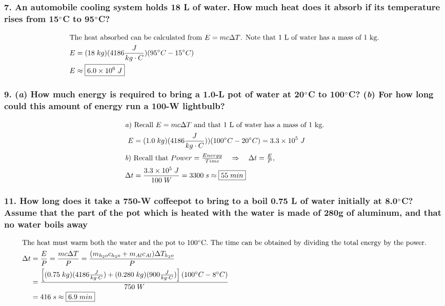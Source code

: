\documentclass{article}
\newcommand\rr{\quad\Rightarrow\quad}
\begin{document}
\subsubsection*{
    7. An automobile cooling system holds 18 L of water. How much heat does
    it absorb if its temperature rises from 15$\degree$C to 95$\degree$C?
}
\begin{align*}
    \intertext{The heat absorbed can be calculated from $E=mc\Delta T$. Note that 1 L of water has a mass of 1 kg.}
    E &= (18\;kg)(4186\frac{J}{kg\cdot C})(95\degree C - 15\degree C) \\  
    E &\approx \boxed{6.0 \times 10^6\;J} \\
\end{align*}
\subsubsection*{
    9. (\textit a) How much energy is required to bring a 1.0-L pot of water at 20$\degree$C to
    100$\degree$C? (\textit b) For how long could this amount of energy run a 100-W lightbulb?
}
\begin{align*}
    \intertext{\textit a) Recall $E = mc\Delta T$ and that 1 L of water has a mass of 1 kg.}
    E &= (1.0\;kg)(4186\frac{J}{kg\cdot C}))(100\degree C - 20\degree C) = 3.3 \times 10^5\;J \\
    \intertext{\textit b) Recall that $Power = \frac{Energy}{Time} \rr \Delta t = \frac{E}{P},$}
    \Delta t &= \frac{3.3 \times 10^5\;J}{100\;W} = 3300\;s \approx \boxed{55\;min} \\
\end{align*}
\subsubsection*{
    11. How long does it take a 750-W coffeepot to bring to a boil 0.75 L of
    water initially at 8.0$\degree$C? Assume that the part of the pot which is
    heated with the water is made of 280g of aluminum, and that no water boils away
}
\begin{align*}
    \intertext{The heat must warm both the water and the pot to 100$\degree$C. The time can be obtained by dividing the total energy by the power.}     
    \Delta t &= \frac{E}{P} = \frac{mc\Delta T}{P} = \frac{(m_{h_2o}c_{h_2o} + m_{Al}c_{Al})\Delta T_{h_2o}}{P} \\
             &= \frac{\left[(0.75\;kg)(4186\frac{J}{kg\cdot C}) + (0.280\;kg)(900\frac{J}{kg\cdot C})\right](100\degree C - 8\degree C)}{750\;W} \\
             &= 416\;s \approx \boxed{6.9\;min} \\ 
\end{align*}
\end{document}
